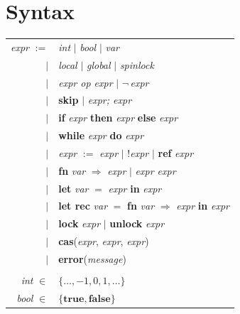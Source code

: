 \documentclass[12pt,a4paper,twoside,openright]{report}
\begin{document}
\section{Syntax}
\begin{tabular}{rl}
	\textit{expr} $:=$ & \textit{int} $\vert$ \textit{bool} $\vert$ \textit{var} \\
	$\vert$ & \textit{local} $\vert$ \textit{global}
	$\vert$ \textit{spinlock} \\
	$\vert$ & \textit{expr op expr} $\vert$ $\neg\,$\textit{expr} \\
	$\vert$ & \textbf{skip} $\vert$ \textit{expr; expr}\\
	$\vert$ & \textbf{if} \textit{expr}
	\textbf{then} \textit{expr} \textbf{else} \textit{expr} \\
	$\vert$ & \textbf{while} \textit{expr}
	\textbf{do} \textit{expr} \\
	$\vert$ & \textit{expr} $:=$ \textit{expr} $\vert$ !\textit{expr}
	$\vert$ \textbf{ref} \textit{expr} \\
	$\vert$ & \textbf{fn} \textit{var}
	$\Rightarrow$ \textit{expr} $\vert$ \textit{expr expr} \\
	$\vert$ & \textbf{let} \textit{var} $=$
	\textit{expr} \textbf{in} \textit{expr} \\
	$\vert$ & \textbf{let rec} \textit{var} $=$
	\textbf{fn} \textit{var} $\Rightarrow$
	\textit{expr} \textbf{in} \textit{expr} \\
	$\vert$ & \textbf{lock} \textit{expr} $\vert$
	\textbf{unlock} \textit{expr} \\
	$\vert$ & \textbf{cas}(\textit{expr}, \textit{expr}, \textit{expr}) \\
	$\vert$ & \textbf{error}(\textit{message}) \\
	& \\
	\textit{int} $\in$ & $\{\ldots, -1, 0, 1, \ldots\}$ \\
	\textit{bool} $\in$ & $\{\textbf{true}, \textbf{false}\}$ \\

\end{tabular}
\qquad\quad
\end{document}
